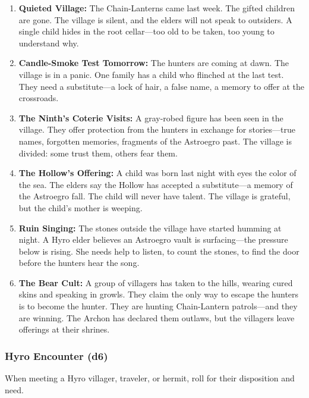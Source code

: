 \begin{enumerate}
\item \textbf{Quieted Village:} The Chain-Lanterns came last week. The gifted children are gone. The village is silent, and the elders will not speak to outsiders. A single child hides in the root cellar---too old to be taken, too young to understand why.
\item \textbf{Candle-Smoke Test Tomorrow:} The hunters are coming at dawn. The village is in a panic. One family has a child who flinched at the last test. They need a substitute---a lock of hair, a false name, a memory to offer at the crossroads.
\item \textbf{The Ninth's Coterie Visits:} A gray-robed figure has been seen in the village. They offer protection from the hunters in exchange for stories---true names, forgotten memories, fragments of the Astroegro past. The village is divided: some trust them, others fear them.
\item \textbf{The Hollow's Offering:} A child was born last night with eyes the color of the sea. The elders say the Hollow has accepted a substitute---a memory of the Astroegro fall. The child will never have talent. The village is grateful, but the child's mother is weeping.
\item \textbf{Ruin Singing:} The stones outside the village have started humming at night. A Hyro elder believes an Astroegro vault is surfacing---the pressure below is rising. She needs help to listen, to count the stones, to find the door before the hunters hear the song.
\item \textbf{The Bear Cult:} A group of villagers has taken to the hills, wearing cured skins and speaking in growls. They claim the only way to escape the hunters is to become the hunter. They are hunting Chain-Lantern patrols---and they are winning. The Archon has declared them outlaws, but the villagers leave offerings at their shrines.
\end{enumerate}

\subsubsection*{Hyro Encounter (d6)}
When meeting a Hyro villager, traveler, or hermit, roll for their disposition and need.

